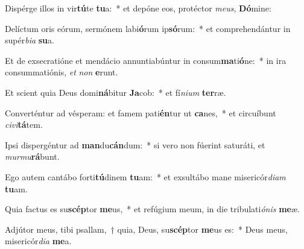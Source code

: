 \item Dispérge illos in vir\textbf{tú}te \textbf{tu}a:~* et depóne eos, protéctor \textit{me}\textit{us}, \textbf{Dó}mine:
\item Delíctum oris eórum, sermónem labi\textbf{ó}rum ip\textbf{só}rum:~* et comprehendántur in supér\textit{bi}\textit{a} \textbf{su}a.
\item Et de exsecratióne et mendácio annuntiabúntur in consum\textbf{ma}ti\textbf{ó}ne:~* in ira consummatiónis, \textit{et} \textit{non} \textbf{e}runt.
\item Et scient quia Deus domi\textbf{ná}bitur \textbf{Ja}cob:~* et fí\textit{ni}\textit{um} \textbf{ter}ræ.
\item Converténtur ad vésperam: et famem pati\textbf{én}tur ut \textbf{ca}nes,~* et circuíbunt \textit{ci}\textit{vi}\textbf{tá}tem.
\item Ipsi dispergéntur ad \textbf{man}du\textbf{cán}dum:~* si vero non fúerint saturáti, et \textit{mur}\textit{mu}\textbf{rá}bunt.
\item Ego autem cantábo forti\textbf{tú}dinem \textbf{tu}am:~* et exsultábo mane misericór\textit{di}\textit{am} \textbf{tu}am.
\item Quia factus es su\textbf{scép}tor \textbf{me}us,~* et refúgium meum, in die tribulati\textit{ó}\textit{nis} \textbf{me}æ.
\item Adjútor meus, tibi psallam,~† quia, Deus, su\textbf{scép}tor \textbf{me}us es:~* Deus meus, misericór\textit{di}\textit{a} \textbf{me}a.
